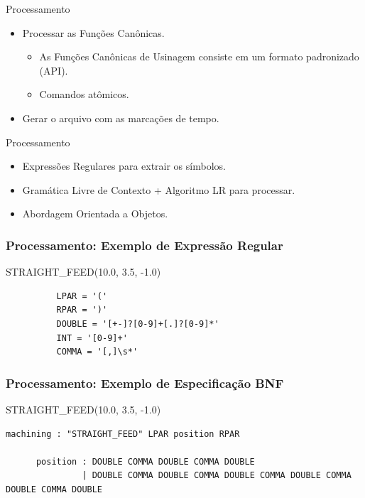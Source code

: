 \documentclass[aspectratio=169]{beamer}
\begin{document}
{\begin{frame}{Processamento}
  \begin{itemize}
    \item Processar as Funções Canônicas.
    \begin{itemize}
      \item As Fun\c c\~oes Can\^onicas de Usinagem consiste em um formato padronizado (API).
      \item Comandos atômicos.
    \end{itemize}
    \item Gerar o arquivo com as marcações de tempo.
  \end{itemize}
\end{frame}

\begin{frame}{Processamento}
  \begin{itemize}
    \item Expressões Regulares para extrair os símbolos.
    \item Gramática Livre de Contexto + Algoritmo LR para processar.
    \item Abordagem Orientada a Objetos.
  \end{itemize}
\end{frame}


\begin{frame}[fragile]
  \frametitle{Processamento: Exemplo de Expressão Regular}
    \begin{example}
      STRAIGHT\_FEED(10.0, 3.5, -1.0)
        \begin{lstlisting}
          LPAR = '('
          RPAR = ')'    
          DOUBLE = '[+-]?[0-9]+[.]?[0-9]*'
          INT = '[0-9]+'
          COMMA = '[,]\s*'
        \end{lstlisting}
      \end{example}
\end{frame}


\begin{frame}[fragile]
  \frametitle{Processamento: Exemplo de Especificação BNF}
  \begin{example}
    STRAIGHT\_FEED(10.0, 3.5, -1.0)
    \begin{lstlisting}[basicstyle=\tiny]
      machining : "STRAIGHT_FEED" LPAR position RPAR

      position : DOUBLE COMMA DOUBLE COMMA DOUBLE
               | DOUBLE COMMA DOUBLE COMMA DOUBLE COMMA DOUBLE COMMA DOUBLE COMMA DOUBLE
    \end{lstlisting}
  \end{example}  
\end{frame}


}
\end{document}
